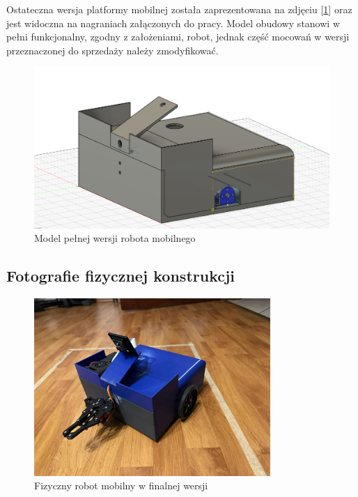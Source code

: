 Ostateczna wersja platformy mobilnej została zaprezentowana na zdjęciu [\ref{fig:full}] oraz jest widoczna na nagraniach załączonych do pracy. Model obudowy stanowi w pełni funkcjonalny, zgodny z założeniami, robot, jednak część mocowań w wersji przeznaczonej do sprzedaży należy zmodyfikować. 

\begin{figure}[H]
  \centering
  \includegraphics[width=1.0\textwidth]{./graf/official-full.png}
  \caption{Model pełnej wersji robota mobilnego}
  \label{fig:full}
\end{figure}

\subsection{Fotografie fizycznej konstrukcji}

\begin{figure}[H]
  \centering
  \includegraphics[width=0.8\textwidth]{./graf/full-side}
  \caption{Fizyczny robot mobilny w finalnej wersji}
\end{figure}


